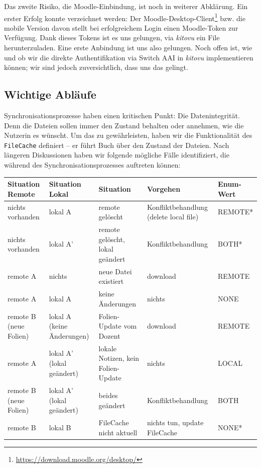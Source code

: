 \documentclass[a4paper]{article}
\begin{document}
Das zweite Risiko, die Moodle-Einbindung, ist noch in weiterer Abklärung. Ein erster Erfolg konnte verzeichnet werden: Der Moodle-Desktop-Client\footnote{\url{https://download.moodle.org/desktop/}} bzw. die mobile Version davon stellt bei erfolgreichem Login einen Moodle-Token zur Verfügung. Dank dieses Tokens ist es uns gelungen, via \emph{kitovu} ein File herunterzuladen. Eine erste Anbindung ist uns also gelungen. Noch offen ist, wie und ob wir die direkte Authentifikation via Switch AAI in \emph{kitovu} implementieren können; wir sind jedoch zuversichtlich, dass uns das gelingt.

\subsection{Wichtige Abläufe}

Synchronisationsprozesse haben einen kritischen Punkt: Die Datenintegrität. Denn die Dateien sollen immer den Zustand behalten oder annehmen, wie die Nutzerin es wünscht. Um das zu gewährleisten, haben wir die Funktionalität des \verb|FileCache| definiert -- er führt Buch über den Zustand der Dateien. Nach längeren Diskussionen haben wir folgende mögliche Fälle identifiziert, die während des Synchronisationsprozesses auftreten können:

\begin{tabulary}{\linewidth}{LLLLl}
	\toprule
	    \bfseries Situation Remote &
	    \bfseries Situation Lokal &
	    \bfseries Situation &
	    \bfseries Vorgehen &
	    \bfseries Enum-Wert\\
	\midrule
nichts vorhanden &	lokal A &	remote gelöscht &	Konfliktbehandlung (delete local file) & 	REMOTE*\\ \hline
nichts vorhanden &	lokal A' &	remote gelöscht, lokal geändert&	Konfliktbehandlung &	BOTH*\\ \hline
remote A &	nichts &	neue Datei existiert &	download &	REMOTE\\ \hline
remote A &	lokal A &	keine Änderungen &	nichts& 	NONE\\\hline
remote B (neue Folien) &	lokal A (keine Änderungen) &	Folien-Update vom Dozent &	download &	REMOTE\\\hline
remote A &	lokal A' (lokal geändert) &	lokale Notizen, kein Folien-Update &	nichts &	LOCAL\\\hline
remote B (neue Folien) &	lokal A' (lokal geändert) &	beides geändert &	Konfliktbehandlung &	BOTH\\\hline
remote B &	lokal B &	FileCache nicht aktuell &	nichts tun, update FileCache &	NONE*\\\hline

\end{tabulary}
\end{document}
